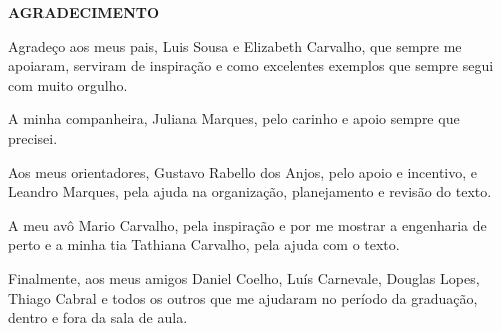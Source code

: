 \begin{center}
\textbf{AGRADECIMENTO}
\end{center}

Agradeço aos meus pais, Luis Sousa e Elizabeth Carvalho, que sempre me apoiaram, serviram de inspiração e como excelentes exemplos que sempre segui com muito orgulho.

A minha companheira, Juliana Marques, pelo carinho e apoio sempre que precisei.

Aos meus orientadores, Gustavo Rabello dos Anjos, pelo apoio e incentivo, e Leandro Marques, pela ajuda na organização, planejamento e revisão do texto.

A meu avô Mario Carvalho, pela inspiração e por me mostrar a engenharia de perto e a minha tia Tathiana Carvalho, pela ajuda com o texto.

Finalmente, aos meus amigos Daniel Coelho, Luís Carnevale, Douglas Lopes, Thiago Cabral e todos os outros que me ajudaram no período da graduação, dentro e fora da sala de aula.